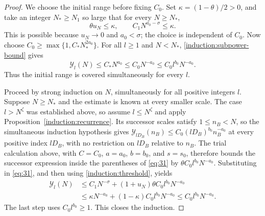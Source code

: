 \begin{proof}
We choose the initial range before fixing $C_0$.  Set
$\kappa=(1-\theta)/2>0$, and take an integer $N_*\ge N_1$ so large that
for every $N\ge N_*$,
\begin{equation}
 \theta u_N\le\kappa,\qquad
 C_1N^{a_0-\sigma}\le\kappa.
 \label{induction:threshold}
\end{equation}
This is possible because $u_N\to0$ and $a_0<\sigma$; the choice is
independent of $C_0$.  Now choose
$C_0\ge\max\{1,C_*N_*^{2a_0}\}$.  For all $l\ge1$ and $N<N_*$,
\eqref{induction:subpower-bound} gives
\[
 \mathcal Y_l(N)\le C_*N^{a_0}
 \le C_0N^{-a_0}\le C_0l^{b_0}N^{-a_0}.
\]
Thus the initial range is covered simultaneously for every $l$.

Proceed by strong induction on $N$, simultaneously for all positive
integers $l$.  Suppose $N\ge N_*$ and the estimate is known at every
smaller scale.  The case $l>N^\zeta$ was established above, so assume
$l\le N^\zeta$ and apply Proposition~\ref{induction:recurrence}.
Its successor scales satisfy $1\le n_B<N$, so the simultaneous induction
hypothesis gives
$\mathcal Y_{lD_B}(n_B)\le C_0(lD_B)^{b_0}n_B^{-a_0}$ at every positive
index $lD_B$, with no restriction on $lD_B$ relative to $n_B$.
The trial calculation above, with $C=C_0$, $a=a_0$, $b=b_0$, and $s=s_0$,
therefore bounds the successor expression inside the parentheses of
\eqref{eq:31} by $\theta C_0l^{b_0}N^{-a_0}$.
Substituting in \eqref{eq:31}, and then using
\eqref{induction:threshold}, yields
\begin{align*}
 \mathcal Y_l(N)
 &\le C_1N^{-\sigma}
       +(1+u_N)\theta C_0l^{b_0}N^{-a_0}\\
 &\le \kappa N^{-a_0}
       +(1-\kappa)C_0l^{b_0}N^{-a_0}
 \le C_0l^{b_0}N^{-a_0}.
\end{align*}
The last step uses $C_0l^{b_0}\ge1$.  This closes the induction.
\end{proof}

